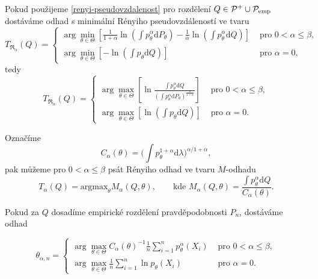 \noindent Pokud použijeme \eqref{renyi-pseudovzdalenost} pro rozdělení $Q \in \mathcal{P}^+ \cup \mathcal{P}_\mathrm{emp}$ dostáváme odhad s minimální Rényiho pseudovzdáleností ve tvaru
\begin{equation}
	T_{\mathfrak{R}_\alpha}(Q) = 
	\begin{cases}
		 \displaystyle{ \arg \min_{\theta \in \Theta} \left[\frac{1}{1+\alpha} \ln(\int p_\theta^\alpha\mathrm{d}P_\theta) - \frac{1}{\alpha} \ln(\int p_\theta^\alpha\mathrm{d}Q) \right]} & \text{ pro } 0 < \alpha \leq \beta, \\
		 \displaystyle{ \arg \min_{\theta \in \Theta} \left[- \ln(\int p_\theta\mathrm{d}Q) \right] }& \text{ pro } \alpha = 0,
	\end{cases}	
\end{equation}
tedy
\begin{equation}
	T_{\mathfrak{R}_\alpha}(Q) = 
	\begin{cases}
		 \displaystyle{ \arg \max_{\theta \in \Theta} \left[\ln\frac{\int p_\theta^\alpha\mathrm{d}Q}{(\int p_\theta^\alpha\mathrm{d}P_\theta)^{\frac{\alpha}{1+\alpha}}} \right] }& \text{ pro } 0 < \alpha \leq \beta, \\
		 \displaystyle{ \arg \max_{\theta \in \Theta} \left[\ln(\int p_\theta\mathrm{d}Q) \right] }& \text{ pro } \alpha = 0.
	\end{cases}	
\end{equation}

\noindent Označíme
\begin{equation}
C_{\alpha}(\theta) = \biggl(\int p_{\theta}^{1+\alpha} \mathrm{d}\lambda\biggr)^{\alpha/{1+\alpha}},
\end{equation}
pak můžeme pro $0<\alpha \leq \beta$ psát Rényiho odhad ve tvaru $M$-odhadu
\begin{equation}
T_{\alpha}(Q) = \text{argmax}_{\theta} M_{\alpha}(Q,\theta), \qquad \text{kde } M_{\alpha}(Q,\theta) = \frac{\int p_{\theta}^{\alpha}\mathrm{d}Q}{C_{\alpha}(\theta)}.
\end{equation}

\noindent Pokud za $Q$ dosadíme empirické rozdělení pravděpodobnosti $P_n$, dostáváme odhad 

\begin{equation}
	\theta_{\alpha,n} = 
	\begin{cases}
		\displaystyle{ \arg \max_{\theta \in \Theta} C_\alpha\left( \theta \right)^{-1} \frac{1}{n} \sum_{i=1}^n p_{\theta}^{\alpha}\left( X_i \right) } & \text{ pro } 0 < \alpha \leq \beta, \\
		\displaystyle{ \arg \max_{\theta \in \Theta}  \frac{1}{n} \sum_{i=1}^n \ln p_{\theta}\left( X_i \right) } & \text{ pro } \alpha = 0.
	\end{cases}	
	\label{Renyi-estimator_formula}
\end{equation}

